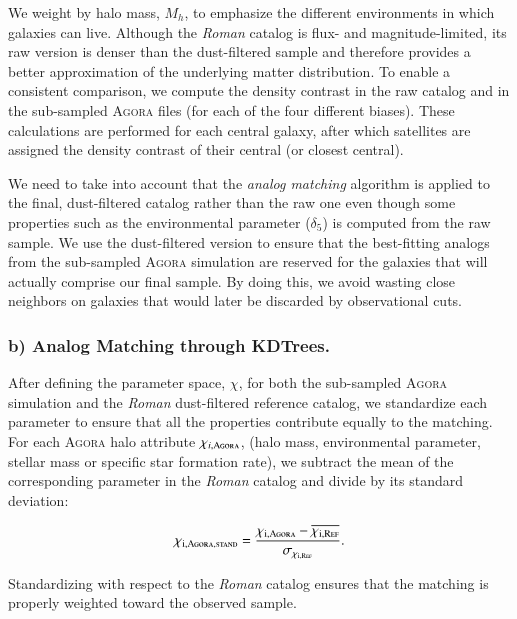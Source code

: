 \documentclass[]{aa} %
\begin{document}
We weight by halo mass, $M_h$, to emphasize the different environments in which galaxies can live. Although the \emph{Roman} catalog is flux- and magnitude-limited, its raw version is denser than the dust-filtered sample and therefore provides a better approximation of the underlying matter distribution. To enable a consistent comparison, we compute the density contrast in the raw catalog and in the sub-sampled \textsc{Agora} files (for each of the four different biases). These calculations are performed for each central galaxy, after which satellites are assigned the density contrast of their central (or closest central). 

We need to take into account that the \emph{analog matching} algorithm is applied to the final, dust-filtered catalog rather than the raw one even though some properties such as the environmental parameter ($\delta_5$) %
is computed from the raw sample. We use the dust-filtered version to ensure that the best-fitting analogs from the sub-sampled \textsc{Agora} simulation are reserved for the galaxies that will actually comprise our final sample. By doing this, we avoid wasting close neighbors on galaxies that would later be discarded by observational cuts.\\

\subsubsection*{{b) Analog Matching through KDTrees.}} After defining the parameter space, $\chi$, for both the sub-sampled \textsc{Agora} simulation and the \emph{Roman} dust-filtered reference catalog, we standardize each parameter to ensure that all the properties contribute equally to the matching. For each \textsc{Agora} halo attribute $\chi_{i,\rm \textsc{Agora}}$, (halo mass, environmental parameter, stellar mass or specific star formation rate), we subtract the mean of the corresponding parameter in the \emph{Roman} catalog and divide by its standard deviation:

\begin{equation}
   \mathrm{ \chi_{i, \textsc{Agora,stand}} = \frac{{}\chi_{i,\textsc{Agora}} - \overline{\chi_{i,\textsc{Ref}}}}{\sigma_{\chi_{i,\textsc{Ref}}}}}.
\end{equation}

Standardizing with respect to the \emph{Roman} catalog ensures that the matching is properly weighted toward the observed sample.
\end{document}
